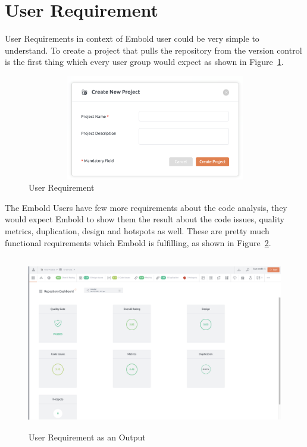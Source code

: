 \section{User Requirement}
User Requirements in context of Embold user could be very simple to understand. To create a project that pulls the repository from the version control is the first thing which every user group would expect as shown in Figure~\ref{fig:Requirement}.\par
\begin{figure}[htbp]
\begin{center}
\includegraphics[width=4.5in, height=1.8in]{requirement.png}
\caption{User Requirement}
\label{fig:Requirement}
\end{center}
\end{figure}
The Embold Users have few more requirements about the code analysis, they would expect Embold to show them the result about the code issues, quality metrics, duplication, design and hotspots as well. These are pretty much functional requirements which Embold is fulfilling, as shown in Figure~\ref{fig:Requirement1}. \par
\begin{figure}[htbp]
\begin{center}
\includegraphics[width=6.5 in, height=3in]{requirement1.png}
\caption{User Requirement as an Output}
\label{fig:Requirement1}
\end{center}
\end{figure}
